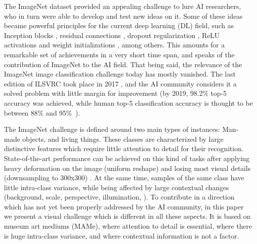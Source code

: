 \documentclass{article}
\begin{document}
The ImageNet dataset provided an appealing challenge to lure AI researchers, who in turn were able to develop and test new ideas on it. Some of these ideas became powerful principles for the current deep learning (DL) field, such as Inception blocks \citep{szegedy2015going}, residual connections \citep{he2016deep}, dropout regularization \citep{srivastava2014dropout}, ReLU activations \citep{nair2010rectified} and weight initializations \citep{glorot2010understanding, he2015delving}, among others. This amounts for a remarkable set of achievements in a very short time span, and speaks of the contribution of ImageNet to the AI field. That being said, the relevance of the ImageNet image classification challenge today has mostly vanished. The last edition of ILSVRC took place in 2017 \citep{Ilsvrc17last}, and the AI community considers it a solved problem with little margin for improvement (by 2019, 98.2\% top-5 accuracy \citep{xie2019selftraining} was achieved, while human top-5 classification accuracy is thought to be between 88\% and 95\%~\citep{russakovsky2015imagenet}).


The ImageNet challenge is defined around two main types of instances: Man-made objects, and living things. These classes are characterized by large distinctive features which require little attention to detail for their recognition. State-of-the-art performance can be achieved on this kind of tasks after applying heavy deformation on the image (\ie uniform reshape) and losing most visual details (\eg downsampling to 300x300) \citep{xie2019selftraining}. At the same time, samples of the same class have little intra-class variance, while being affected by large contextual changes (background, scale, perspective, illumination, \etc). To contribute in a direction which has not yet been properly addressed by the AI community, in this paper we present a visual challenge which is different in all these aspects. It is based on museum art mediums (MAMe), where attention to detail is essential, where there is huge intra-class variance, and where contextual information is not a factor.
\end{document}
